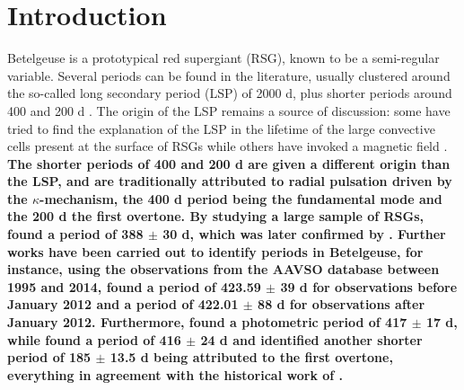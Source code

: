 \documentclass{aa}
\begin{document}
   \keywords{
               }

   \maketitle
%

\section{Introduction}
\label{sec: Introduction}
Betelgeuse is a prototypical red supergiant (RSG), known to be a semi-regular variable. Several periods can be found in the 
literature, usually clustered around the so-called long secondary period (LSP) of 2000 d, plus shorter periods around 400 and 200 d \citep{kiss_variability_2006}. The origin of the LSP remains a source of discussion: some have tried to find the explanation of the LSP in the lifetime of the large convective cells present at the surface of RSGs \citep[e.g][]{stothers_giant_2010} while others have invoked a magnetic field \citep{wood_long_2004}. \textbf{The shorter periods of 400 and 200 d are given a different origin than the LSP, and are traditionally attributed to radial pulsation driven by the $\kappa$-mechanism, the 400 d period  being the fundamental mode and the 200 d the first overtone. By studying a large sample of RSGs, \cite{kiss_variability_2006} found a period of 388 $\pm$ 30 d, which was later confirmed by \cite{chatys_periodluminosity_2019}. Further works have been carried out to identify periods in Betelgeuse, for instance, using the observations from the AAVSO database between 1995 and 2014, \cite{montarges_close_2016} found a period of 423.59 $\pm$ 39 d for observations before January 2012 and a period of 422.01 $\pm$ 88 d for observations after January 2012. Furthermore, \cite{jadlovsky_analysis_2023} found a photometric period of 417 $\pm$ 17 d, while \cite{joyce_standing_2020} found a period of 416 $\pm$ 24 d and identified another shorter period of 185 $\pm$ 13.5 d being attributed to the first overtone, everything in agreement with the historical work of \cite{stothers_pulsation_1969}.}\\
\end{document}
